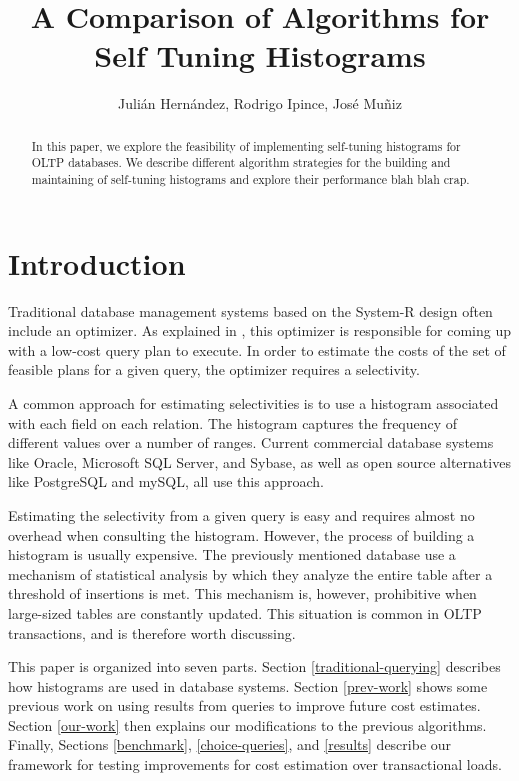\documentclass[twocolumn]{article}
\author{Juli\'{a}n Hern\'{a}ndez, Rodrigo Ipince, Jos\'{e} Mu\~{n}iz}
\title{A Comparison of Algorithms for Self Tuning Histograms}
\begin{document}
\maketitle


\begin{abstract}
In this paper, we explore the feasibility of implementing self-tuning histograms for OLTP databases. We describe
different algorithm strategies for the building and maintaining of self-tuning histograms and explore their
performance blah blah crap.

\end{abstract}


\section{Introduction}

Traditional database management systems based on the System-R design often include an optimizer. As explained in \cite{astrahan-76}, this optimizer is responsible for coming up with a low-cost query plan to execute. In order to estimate the costs of the set of feasible plans for a given query, the optimizer requires a selectivity. 


A common approach for estimating selectivities is to use a histogram associated with each field on each relation. The histogram captures the frequency of different values over a number of ranges.  Current commercial database systems like Oracle, Microsoft SQL Server, and Sybase, as well as open source alternatives like PostgreSQL and mySQL, all use this approach. 

Estimating the selectivity from a given query is easy and requires almost no overhead when consulting the histogram. However, the process of building a histogram is usually expensive. The previously mentioned database use a mechanism of statistical analysis by which they analyze the entire table after a threshold of insertions is met. This mechanism is, however, prohibitive when large-sized tables are constantly updated. This situation is common in OLTP transactions, and is therefore worth discussing.



This paper is organized into seven parts. Section \ref{traditional-querying} describes how histograms are used in database systems. Section \ref{prev-work} shows some previous work on using results from queries to improve future cost estimates. Section \ref{our-work} then explains our modifications to the previous algorithms. Finally, Sections \ref{benchmark},  \ref{choice-queries}, and \ref{results} describe our framework for testing improvements for cost estimation over transactional loads. 
\end{document}
